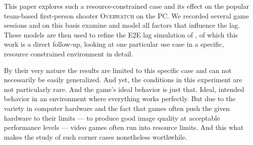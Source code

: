 This paper explores such a resource-constrained case and its effect on the popular team-based first-person shooter \textsc{Overwatch} on the PC. We recorded several game sessions and on this basis examine and model all factors that influence the lag. These models are then used to refine the \gls{E2E} lag simulation of \cite{Metzger+2016}, of which this work is a direct follow-up, looking at one particular use case in a specific, resource constrained environment in detail. 

By their very nature the results are limited to this specific case and can not necessarily be easily generalized. And yet, the conditions in this experiment are not particularly rare. And the game's ideal behavior is just that. Ideal, intended behavior in an environment where everything works perfectly. But due to the variety in computer hardware and the fact that games often push the given hardware to their limits --- to produce good image quality at acceptable performance levels --- video games often run into resource limits. And this what makes the study of such corner cases nonetheless worthwhile.


